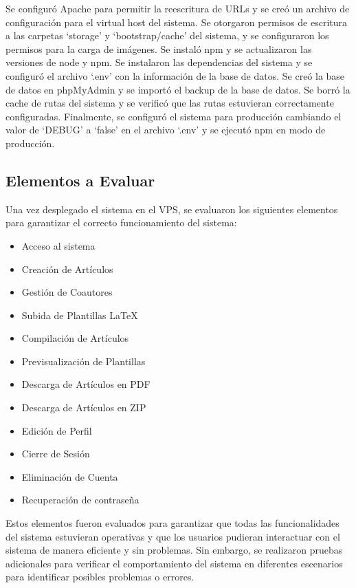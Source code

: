 Se configuró Apache para permitir la reescritura de URLs y se creó un archivo de configuración para el virtual host del sistema. Se otorgaron permisos de escritura a las carpetas `storage' y `bootstrap/cache' del sistema, y se configuraron los permisos para la carga de imágenes. Se instaló npm y se actualizaron las versiones de node y npm. Se instalaron las dependencias del sistema y se configuró el archivo `.env' con la información de la base de datos. Se creó la base de datos en phpMyAdmin y se importó el backup de la base de datos. Se borró la cache de rutas del sistema y se verificó que las rutas estuvieran correctamente configuradas. Finalmente, se configuró el sistema para producción cambiando el valor de `DEBUG' a `false' en el archivo `.env' y se ejecutó npm en modo de producción. 

\subsection{Elementos a Evaluar}
Una vez desplegado el sistema en el VPS, se evaluaron los siguientes elementos para garantizar el correcto funcionamiento del sistema: 

\begin{itemize}
    \item Acceso al sistema
    \item Creación de Artículos
    \item Gestión de Coautores
    \item Subida de Plantillas LaTeX
    \item Compilación de Artículos
    \item Previsualización de Plantillas
    \item Descarga de Artículos en PDF
    \item Descarga de Artículos en ZIP
    \item Edición de Perfil
    \item Cierre de Sesión
    \item Eliminación de Cuenta
    \item Recuperación de contraseña
\end{itemize}

Estos elementos fueron evaluados para garantizar que todas las funcionalidades del sistema estuvieran operativas y que los usuarios pudieran interactuar con el sistema de manera eficiente y sin problemas. Sin embargo, se realizaron pruebas adicionales para verificar el comportamiento del sistema en diferentes escenarios para identificar posibles problemas o errores.

